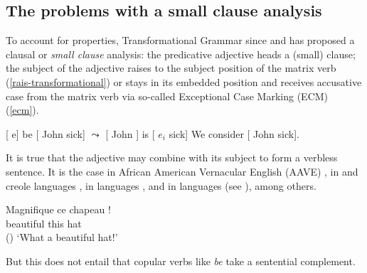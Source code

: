 \subsection{The problems with a small clause analysis}

To account for  properties, Transformational Grammar since \citet{Stowell1983}\addpages and
\citet{Chomsky1986}\addpages has proposed a clausal or \emph{small clause} analysis: the predicative
adjective heads a (small) clause; the subject of the adjective raises to the subject position of the
matrix verb (\ref{rais-transformational}) or stays in its embedded position and receives accusative case from
the matrix verb via so-called Exceptional Case Marking (ECM) (\ref{ecm}).


\eal
\ex
\label{rais-transformational}
{}[ e] be [ John sick] $\leadsto$  [ John ] is  [ $e_{i}$ sick]
\ex
\label{ecm}
We consider [ John sick].
\zl

It is true that the adjective may combine with its subject to form a verbless sentence. It is the
case in African American Vernacular English (AAVE) \citep{Bender2001a}\addpages, in  \citep{Laurens2008}\addpages and creole languages
\citep{HenriandAbeille2007}\addpages, in  languages \citep{Zec87a-u}\addpages, and in  languages (see
\citealp{Alqurashi:Borsley:14}\addpages), among others. 

\ea
\gll Magnifique ce chapeau !\\
     beautiful this hat\\\hfill{()}
\glt `What a beautiful hat!'
\z

\noindent
But this does not entail that copular verbs like \emph{be} take a sentential complement. 




